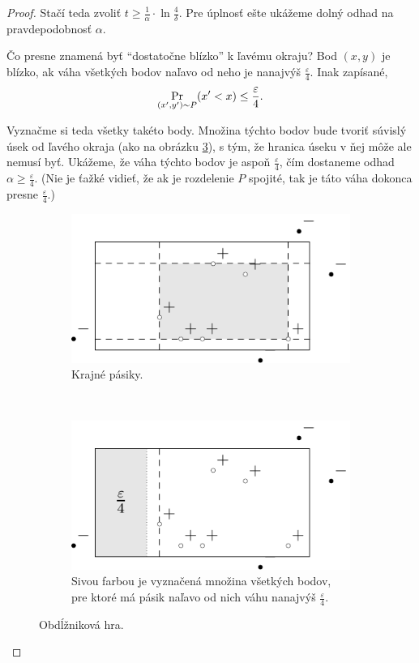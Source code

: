 \begin{proof}
  Stačí teda zvoliť $t \geq \frac{1}{\alpha} \cdot \ln{\frac{4}{\delta}}$.
  Pre úplnosť ešte ukážeme dolný odhad na pravdepodobnosť $\alpha$.
  
  Čo presne znamená byť ``dostatočne blízko'' k ľavému okraju?
  Bod $(x, y)$ je blízko, ak váha všetkých bodov naľavo od neho je
  nanajvýš $\frac{\varepsilon}{4}$. Inak zapísané,
  $$ \operatorname*{\mathrm{Pr}}_{(x',y') \sim P} (x' < x) \leq \frac{\varepsilon}{4}.$$
  
  Vyznačme si teda všetky takéto body. Množina týchto bodov bude tvoriť
  súvislý úsek od ľavého okraja (ako na obrázku \ref{rectgame:eps_strip}),
  s tým, že hranica úseku v ňej môže ale nemusí byť. Ukážeme, že váha
  týchto bodov je aspoň $\frac{\varepsilon}{4}$, čím dostaneme odhad
  $\alpha \geq \frac{\varepsilon}{4}$. (Nie je ťažké vidieť, že ak je
  rozdelenie $P$ spojité, tak je táto váha dokonca presne
  $\frac{\varepsilon}{4}$.)
  
  \begin{figure}
    \begin{subfigure}[t]{0.49\linewidth}
      \centering
      \includegraphics[scale=1]{obrazky/rectgame2.pdf}
      \caption{Krajné pásiky.}
      \label{rectgame:strips}
    \end{subfigure}
    ~
    \begin{subfigure}[t]{0.49\linewidth}
      \centering
      \includegraphics[scale=1]{obrazky/rectgame3.pdf}
      \caption{Sivou farbou je vyznačená množina všetkých
        bodov, pre ktoré má pásik naľavo od nich váhu nanajvýš
        $\frac{\varepsilon}{4}$.}
      \label{rectgame:eps_strip}
    \end{subfigure}
    \caption{Obdĺžniková hra.}
  \end{figure}
  
\end{proof}




